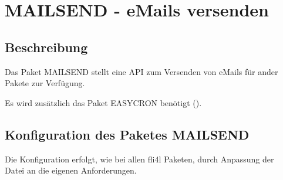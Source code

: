 \section {MAILSEND - eMails versenden}

\subsection {Beschreibung}
    Das Paket MAILSEND stellt eine API zum Versenden von eMails für ander Pakete
    zur Verfügung.
    
    Es wird zusätzlich das Paket EASYCRON benötigt ().

\subsection {Konfiguration des Paketes MAILSEND}
    Die Konfiguration erfolgt, wie bei allen fli4l Paketen, durch Anpassung der \\
    Datei 
    an die eigenen Anforderungen.

